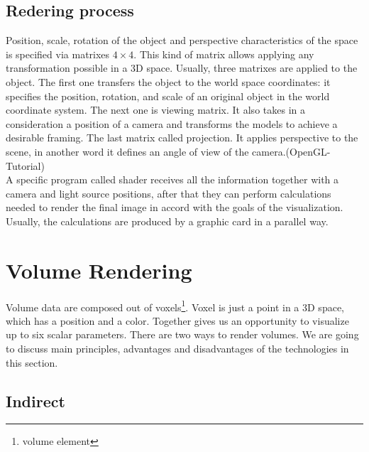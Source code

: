 \documentclass[twoside, english, 11pt]{report}
\begin{document}
\subsection{Redering process}
Position, scale, rotation of the object and perspective characteristics of the space is specified via matrixes $4\times4$. This kind of matrix allows applying any transformation possible in a 3D space. Usually, three matrixes are applied to the object. The first one transfers the object to the world space coordinates: it specifies the position, rotation, and scale of an original object in the world coordinate system. The next one is viewing matrix. It also takes in a consideration a position of a camera and transforms the models to achieve a desirable framing. The last matrix called projection. It applies perspective to the scene, in another word it defines an angle of view of the camera.(OpenGL-Tutorial)\\

A specific program called shader receives all the information together with a camera and light source positions, after that they can perform calculations needed to render the final image in accord with the goals of the visualization. Usually, the calculations are produced by a graphic card in a parallel way.

\section{Volume Rendering}

Volume data are composed out of voxels\footnote{volume element}. Voxel is just a point in a 3D space, which has a position and a color. Together gives us an opportunity to visualize up to six scalar parameters. There are two ways to render volumes. We are going to discuss main principles, advantages and disadvantages of the technologies in this section.\\

\subsection{Indirect}
\end{document}
